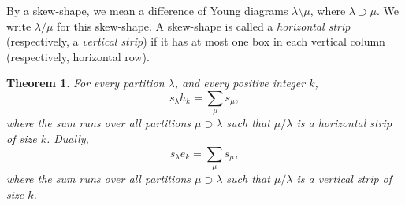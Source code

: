 \documentclass[11pt]{amsart}
\newtheorem{theorem}{Theorem}[subsection]
\theoremstyle{definition}
\theoremstyle{example}
\begin{document}
By a skew-shape, we mean a difference of Young diagrams $\lambda \setminus \mu$, where $\lambda \supset \mu$.
We write $\lambda/\mu$ for this skew-shape.
A skew-shape is called a \emph{horizontal strip} (respectively, a \emph{vertical strip}) if it has at most one box in each vertical column (respectively, horizontal row).
\begin{theorem}
  For every partition $\lambda$, and every positive integer $k$,
  \begin{displaymath}
    s_\lambda h_k = \sum_\mu s_\mu,
  \end{displaymath}
  where the sum runs over all partitions $\mu\supset\lambda$ such that $\mu/\lambda$ is a horizontal strip of size $k$.
  Dually,
  \begin{displaymath}
    s_\lambda e_k = \sum_\mu s_\mu,
  \end{displaymath}
  where the sum runs over all partitions $\mu\supset\lambda$ such that $\mu/\lambda$ is a vertical strip of size $k$.
\end{theorem}
\end{document}
